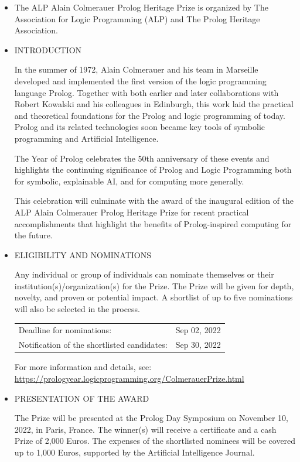 \documentclass[prodmode,acmtecs]{acmsmall} %
\begin{document}
\begin{itemize}\item  The ALP Alain Colmerauer Prolog Heritage Prize is organized by The Association for Logic Programming (ALP) and The Prolog Heritage Association. 
 
\item  INTRODUCTION  
 
  In the summer of 1972, Alain Colmerauer and his team in Marseille developed and implemented the first version of the logic programming language Prolog. Together with both earlier and later collaborations with Robert Kowalski and his colleagues in Edinburgh, this work laid the practical and theoretical foundations for the Prolog and logic programming of today. Prolog and its related technologies soon became key tools of symbolic programming and Artificial Intelligence. 
 
  The Year of Prolog celebrates the 50th anniversary of these events and highlights the continuing significance of Prolog and Logic Programming both for symbolic, explainable AI, and for computing more generally. 
 
  This celebration will culminate with the award of the inaugural edition of the ALP Alain Colmerauer Prolog Heritage Prize for recent practical accomplishments that highlight the benefits of Prolog-inspired computing for the future.  
 
\item  ELIGIBILITY AND NOMINATIONS 
 
  Any individual or group of individuals can nominate themselves or their institution(s)/organization(s) for the Prize. The Prize will be given for depth, novelty, and proven or potential impact. A shortlist of up to five nominations will also be selected in the process. 
 
\begin{tabulary}{\linewidth}{LL}Deadline for nominations:  & Sep 02, 2022 \\
Notification of the shortlisted candidates:  & Sep 30, 2022 \\
\end{tabulary}
 
  For more information and details, see: \href{https://prologyear.logicprogramming.org/ColmerauerPrize.html}{https://prologyear.logicprogramming.org/ColmerauerPrize.html} 
 
\item  PRESENTATION OF THE AWARD 
 
  The Prize will be presented at the Prolog Day Symposium on November 10, 2022, in Paris, France. The winner(s) will receive a certificate and a cash Prize of 2,000 Euros. The expenses of the shortlisted nominees will be covered up to 1,000 Euros, supported by the Artificial Intelligence Journal. 
 

\end{itemize}
\end{document}
